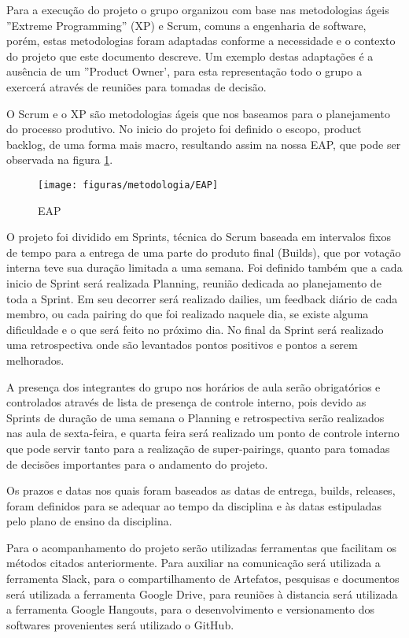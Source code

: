 Para a execução do projeto o grupo organizou com base nas metodologias ágeis ''Extreme Programming'' (XP) e Scrum, comuns a engenharia de software, porém, estas metodologias foram adaptadas conforme a necessidade e o contexto do projeto que este documento descreve. Um exemplo destas adaptações é a ausência de um ''Product Owner', para esta representação todo o grupo a exercerá através de reuniões para tomadas de decisão.

O Scrum e o XP são metodologias ágeis que nos baseamos para o planejamento do processo produtivo. No inicio do projeto foi definido o escopo, product backlog, de uma forma mais macro, resultando assim na nossa EAP, que pode ser observada na figura \ref{fig:eap}.

\begin{figure}[!htb]
\centering
  \texttt{[image: figuras/metodologia/EAP]}
\caption{EAP}
\label{fig:eap}
\end{figure}

O projeto foi dividido em Sprints, técnica do Scrum baseada em intervalos fixos de tempo para a entrega de uma parte do produto final (Builds), que por votação interna teve sua duração limitada a uma semana. Foi definido também que a cada inicio de Sprint será realizada Planning, reunião dedicada ao planejamento de toda a Sprint. Em seu decorrer será realizado dailies, um feedback diário de cada membro, ou cada pairing do que foi realizado naquele dia, se existe alguma dificuldade e o que será feito no próximo dia. No final da Sprint será realizado uma retrospectiva onde são levantados pontos positivos e pontos a serem melhorados.

A presença dos integrantes do grupo nos horários de aula serão obrigatórios e controlados através de lista de presença de controle interno, pois devido as Sprints de duração de uma semana o Planning e retrospectiva serão realizados nas aula de sexta-feira, e quarta feira será realizado um ponto de controle interno que pode servir tanto para a realização de super-pairings, quanto para tomadas de decisões importantes para o andamento do projeto.

Os prazos e datas nos quais foram baseados as datas de entrega, builds, releases, foram definidos para se adequar ao tempo da disciplina e às datas estipuladas pelo plano de ensino da disciplina.

Para o acompanhamento do projeto serão utilizadas ferramentas que facilitam os métodos citados anteriormente. Para auxiliar na comunicação será utilizada a ferramenta Slack, para o compartilhamento de Artefatos, pesquisas e documentos será utilizada a ferramenta Google Drive, para reuniões à distancia será utilizada a ferramenta Google Hangouts, para o desenvolvimento  e versionamento dos softwares provenientes será utilizado o GitHub.

